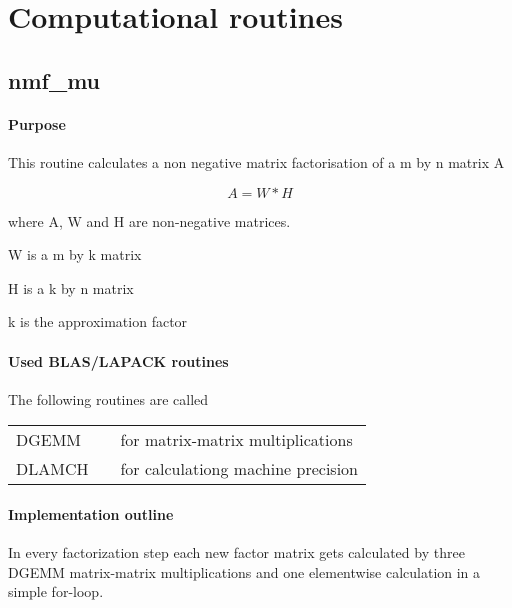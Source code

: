 \documentclass[a4paper,10pt]{scrartcl}
\begin{document}
			
	


	\section{Computational routines}


		\subsection{nmf\_mu}

			\paragraph{Purpose}

					This routine calculates a non negative matrix factorisation of a m by n 
					matrix A\newline
					
					\begin{equation*}
						A = W * H
					\end{equation*}

 					where A, W and H are non-negative matrices.

 					W is a m by k matrix

 					H is a k by n matrix

 					k is the approximation factor

			\paragraph{Used BLAS/LAPACK routines}

					The following routines are called\newline

					\begin{tabular}{lcl}
						DGEMM && for matrix-matrix multiplications\\
						DLAMCH && for calculationg machine precision
					\end{tabular}
					
			\paragraph{Implementation outline}

					In every factorization step each new factor matrix gets calculated by
					three DGEMM matrix-matrix multiplications and one elementwise calculation
					in a simple for-loop.\newline
\end{document}
